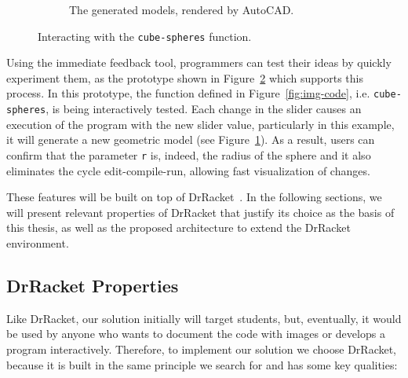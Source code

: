\begin{figure}[htb]
\begin{subfigure}{0.35\textwidth}
                \caption{The generated models, rendered by AutoCAD.}
                \label{fig:cube}
        \end{subfigure}
        \vspace{-5pt}
        \caption{Interacting with the \texttt{cube-spheres} function.}
        \label{fig:slider}
 \vspace{-10pt}
\end{figure}

Using the immediate feedback tool, programmers can test their ideas by quickly experiment them, as the prototype shown in Figure~\ref{fig:slider} which supports this process. In this prototype, the function defined in Figure~\ref{fig:img-code}, i.e. \texttt{cube-spheres}, is being interactively tested. Each change in the slider causes an execution of the program with the new slider value, particularly in this example, it will generate a new geometric model (see Figure~\ref{fig:cube}). As a result, users can confirm that the parameter \texttt{r} is, indeed, the radius of the sphere and it also eliminates the cycle edit-compile-run, allowing fast visualization of changes.  

These features will be built on top of DrRacket~\cite{findler2002drscheme}. In the following sections, we will present relevant properties of DrRacket that justify its choice as the basis of this thesis, as well as the proposed architecture to extend the DrRacket environment.

\subsection{DrRacket Properties}

Like DrRacket, our solution initially will target students, but, eventually, it would be used by anyone who wants to document the code with images or develops a program interactively. Therefore, to implement our solution we choose DrRacket, because it is built in the same principle we search for and has some key qualities:

